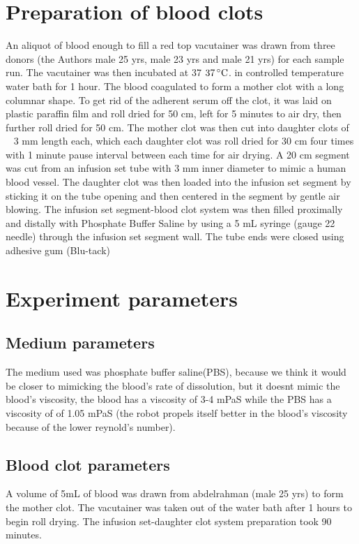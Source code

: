 \documentclass{MNR}
\begin{document}
\maketitle 
\section*{Preparation of blood clots}
An aliquot of blood enough to fill a red top vacutainer was drawn from three donors (the Authors male 25 yrs, male 23 yrs and male 21 yrs) for each sample run. The vacutainer was then incubated at 37  $37\,^{\circ}{\rm C}$. in controlled temperature water bath for 1 hour. The blood coagulated to form a mother clot with a long columnar shape. To get rid of the adherent serum off the clot, it was laid on plastic paraffin film and roll dried for 50 cm, left for 5 minutes to air dry, then further roll dried for 50 cm. The mother clot was then cut into daughter clots of ~ 3 mm length each, which each daughter clot was roll dried for 30 cm four times with 1 minute pause interval between each time for air drying. A 20 cm segment was cut from an infusion set tube with 3 mm inner diameter to mimic a human blood vessel. The daughter clot was then loaded into the infusion set segment by sticking it on the tube opening and then centered in the segment by gentle air blowing. The infusion set segment-blood clot system was then filled proximally and distally with Phosphate Buffer Saline by using a 5 mL syringe (gauge 22 needle) through the infusion set segment wall. The tube ends were closed using adhesive gum (Blu-tack)

\section*{Experiment parameters}

\subsection*{Medium parameters}
The medium used was phosphate buffer saline(PBS), because we think it would be closer to mimicking the blood's rate of dissolution,  but it doesnt mimic the blood's viscosity, the blood has a viscosity of 3-4 mPaS while the PBS has a viscosity of of 1.05 mPaS (the robot propels itself better in the blood's viscosity because of the lower reynold's number).

\subsection*{Blood clot parameters}
A volume of 5mL of blood was drawn from abdelrahman (male 25 yrs) to form the mother clot. The vacutainer was taken out of the water bath after 1 hours to begin roll drying. The infusion set-daughter clot system preparation took 90 minutes.
\end{document}
